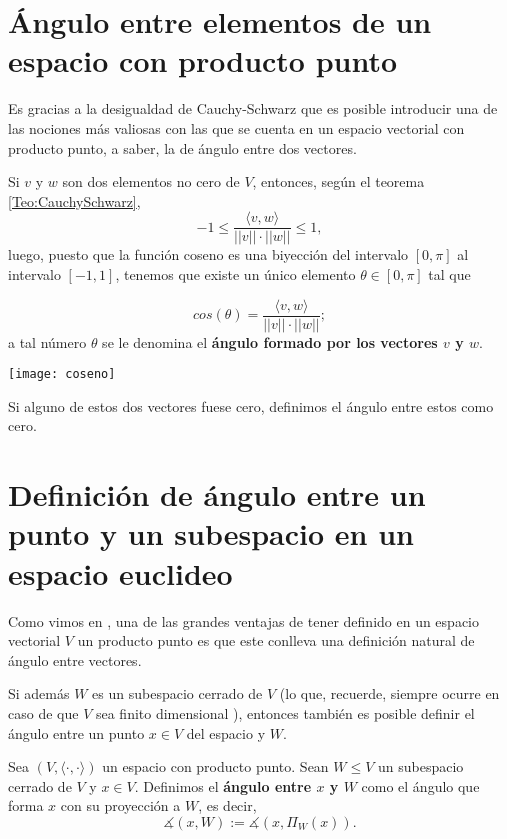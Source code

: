 
\section{Ángulo entre elementos de un espacio con producto punto}

Es gracias a la desigualdad de Cauchy-Schwarz
que es posible introducir una de las nociones
más valiosas con las que se cuenta en un espacio
vectorial con producto punto, a saber, la de ángulo entre dos
vectores.

Si $v$ y $w$ son dos elementos no cero de $V$, entonces,
según el teorema \ref{Teo:CauchySchwarz},
\[
-1 \leq \frac{\langle v, w \rangle}{||v|| \cdot ||w||} \leq 1,
\]
luego, puesto que la función coseno es una biyección
del intervalo $[0, \pi]$ al intervalo $[-1,1]$,
tenemos que existe un único elemento 
$\theta \in [0, \pi]$ tal que

\[
cos(\theta)= \frac{\langle v, w \rangle}{||v|| \cdot ||w||};
\]
a tal número $\theta$ se le denomina el 
\textbf{ángulo formado por los vectores $v$ y $w$}.

\begin{marginfigure}
\texttt{[image: coseno]}
\end{marginfigure}

Si alguno de estos dos vectores fuese cero, definimos
el ángulo entre estos como cero. 




\section{Definición de ángulo entre un punto y un subespacio en un espacio euclideo}

Como vimos en , una de las grandes ventajas de tener
definido en un espacio vectorial $V$ un producto punto es
que este conlleva una definición natural de ángulo entre
vectores.

Si además $W$ es un subespacio cerrado de $V$
(lo que, recuerde, siempre ocurre en caso de que
$V$ sea finito dimensional ), entonces también
es posible definir el ángulo entre un punto $x \in V$
del espacio y $W$.

\begin{defi} \label{def: angulo punto subespacio}
Sea $(V, \langle \cdot , \cdot \rangle)$ un espacio con 
producto punto. Sean $W \leq V$ un subespacio cerrado de $V$
y $x \in V$. Definimos el \textbf{ángulo entre $x$ y $W$}
como el ángulo que forma 
$x$ con su proyección a $W$, es decir,
\[
\measuredangle (x, W):= \measuredangle(x, \Pi_{W}(x)).
\]
\end{defi}

